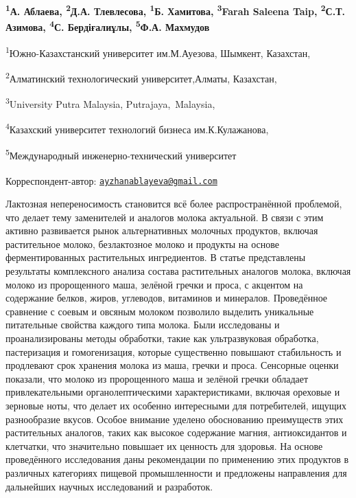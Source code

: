 
\begin{articleheader}

{\bfseries
\textsuperscript{1}А. Аблаева\textsuperscript{\envelope },
\textsuperscript{2}Д.А. Тлевлесова,
\textsuperscript{1}Б. Хамитова,
\textsuperscript{3}Farah Saleena Taip,
\textsuperscript{2}С.Т. Азимова,
\textsuperscript{4}С. Бердіғалиұлы,
\textsuperscript{5}Ф.А. Махмудов
}
\end{articleheader}

\begin{affiliation}
\textsuperscript{1}Южно-Казахстанский университет им.М.Ауезова, Шымкент,
Казахстан,

\textsuperscript{2}Алматинский технологический университет,Алматы,
Казахстан,

\textsuperscript{3}University Putra Malaysia, Putrajaya,~Malaysia,

\textsuperscript{4}Казахский университет технологий бизнеса
им.К.Кулажанова,

\textsuperscript{5}Международный инженерно-технический университет

\raggedright \textsuperscript{\envelope }Корреспондент-автор:
\href{mailto:ayzhanablayeva@gmail.com}{\nolinkurl{ayzhanablayeva@gmail.com}}
\end{affiliation}

Лактозная непереносимость становится всё более распространённой
проблемой, что делает тему заменителей и аналогов молока актуальной. В
связи с этим активно развивается рынок альтернативных молочных
продуктов, включая растительное молоко, безлактозное молоко и продукты
на основе ферментированных растительных ингредиентов. В статье
представлены результаты комплексного анализа состава растительных
аналогов молока, включая молоко из пророщенного маша, зелёной гречки и
проса, с акцентом на содержание белков, жиров, углеводов, витаминов и
минералов. Проведённое сравнение с соевым и овсяным молоком позволило
выделить уникальные питательные свойства каждого типа молока. Были
исследованы и проанализированы методы обработки, такие как
ультразвуковая обработка, пастеризация и гомогенизация, которые
существенно повышают стабильность и продлевают срок хранения молока из
маша, гречки и проса. Сенсорные оценки показали, что молоко из
пророщенного маша и зелёной гречки обладает привлекательными
органолептическими характеристиками, включая ореховые и зерновые ноты,
что делает их особенно интересными для потребителей, ищущих разнообразие
вкусов. Особое внимание уделено обоснованию преимуществ этих
растительных аналогов, таких как высокое содержание магния,
антиоксидантов и клетчатки, что значительно повышает их ценность для
здоровья. На основе проведённого исследования даны рекомендации по
применению этих продуктов в различных категориях пищевой промышленности
и предложены направления для дальнейших научных исследований и
разработок.

